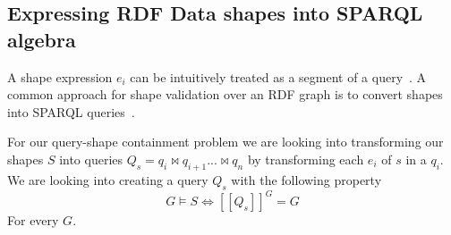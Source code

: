 \iffalse
\begin{algorithm}
   \caption{Dynamic reachability generation algorithm with a shape index}\label{alg:shapeIndex}
   \begin{algorithmic}
      \REQUIRE Given a Shape Index $(M, D)$ and a query $Q$
      \ENSURE $IRI_d$ a set of IRI leading to query relevant sources and $IRI_p$ a set of IRI leading to non query relevant sources

      \STATE Divide the $Q$ into a set of star pattern with dependencies $Q_{sd}$ such that $Q = q_{sd,1}  \bowtie q_{sd,2} ... \bowtie q_{sd,n}$ given $n$  $q_{sd,i}$.
      \STATE $IRI_d = \{\}$
      \STATE $ContainedQueries = \{\}$
      \STATE $IRI_p = \{\}$

      \FORALL{$q_{sd} \in Q_{sd}$}
         \FORALL{$(s, iri) \in M$}
            \IF{$q_{sd} \sqsubseteq_l T(s)$}
               \STATE $IRI_d = IRI_d \cup \{iri\}$
               \STATE $ContainedQueries = ContainedQueries \cup \{q_{sd}\}$   
            \ENDIF
         \ENDFOR
      \ENDFOR
      
      

      \IF{$(IRI_0 \in D) = \emptyset$ \OR $Q_{sd} \setminus containedQueries = \emptyset$}
         \STATE $IRI_p = D \setminus IRI_d$
      \ELSE
         \STATE $IRI_m = \{\text{Codomain of }m_i(s)| \forall m_i \in M \}$
         \STATE $IRI_p = IRI_m \setminus IRI_d$
      \ENDIF
   \end{algorithmic}
\end{algorithm}
\fi


\subsection{Expressing RDF Data shapes into SPARQL algebra}\label{sec:shape2SPARQL}

A shape expression $e_i$ can be intuitively treated as a segment of a query~\cite{delva2023}.
A common approach for shape validation over an RDF graph is to convert shapes into SPARQL queries~\cite{labragayo2017validatingdescribinglinkeddata, Corman2019,Prestamo2023, spapeExpressionConvert}.~

\iffalse
For our query-shape containment problem we are looking into transforming our shapes $S$ into queries $Q_s =  q_i \bowtie q_{i+1} ... \bowtie q_n$ by transforming each $e_i$ of $s$ in a $q_i$.
We are looking into creating a query $Q_s$ with the following property
\begin{equation}\label{eq:shapeSPARQL}
   G \models S \iff [\![ Q_s ]\!]^{G} =  G
\end{equation}
For every $G$.


